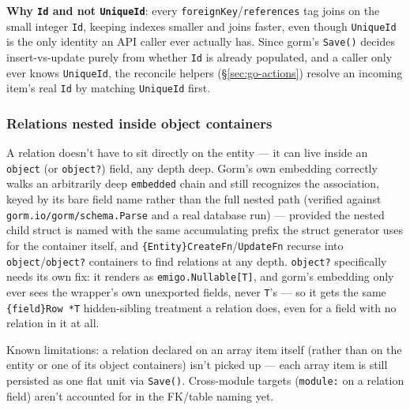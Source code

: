 \textbf{Why \texttt{Id} and not \texttt{UniqueId}}: every
\texttt{foreignKey}/\allowbreak\texttt{references} tag joins on the small integer
\texttt{Id}, keeping indexes smaller and joins faster, even though
\texttt{UniqueId} is the only identity an API caller ever actually has.
Since gorm's \texttt{Save()} decides insert-vs-update purely from whether
\texttt{Id} is already populated, and a caller only ever knows
\texttt{UniqueId}, the reconcile helpers (\S\ref{sec:go-actions}) resolve
an incoming item's real \texttt{Id} by matching \texttt{UniqueId} first.

\subsubsection{Relations nested inside object containers}
A relation doesn't have to sit directly on the entity --- it can live
inside an \texttt{object} (or \texttt{object?}) field, any depth deep.
Gorm's own embedding correctly walks an arbitrarily deep \texttt{embedded}
chain and still recognizes the association, keyed by its bare field name
rather than the full nested path (verified against
\texttt{gorm.io/gorm/schema.Parse} and a real database run) --- provided
the nested child struct is named with the same accumulating prefix the
struct generator uses for the container itself, and
\texttt{\{Entity\}CreateFn}/\texttt{UpdateFn} recurse into
\texttt{object}/\texttt{object?} containers to find relations at any
depth. \texttt{object?} specifically needs its own fix: it renders as
\texttt{emigo.Nullable[T]}, and gorm's embedding only ever sees the
wrapper's own unexported fields, never \texttt{T}'s --- so it gets the
same \texttt{\{field\}Row *T} hidden-sibling treatment a relation does,
even for a field with no relation in it at all.

\begin{pullquote}
Known limitations: a relation declared on an array item itself (rather
than on the entity or one of its object containers) isn't picked up ---
each array item is still persisted as one flat unit via \texttt{Save()}.
Cross-module targets (\texttt{module:} on a relation field) aren't
accounted for in the FK/table naming yet.
\end{pullquote}
